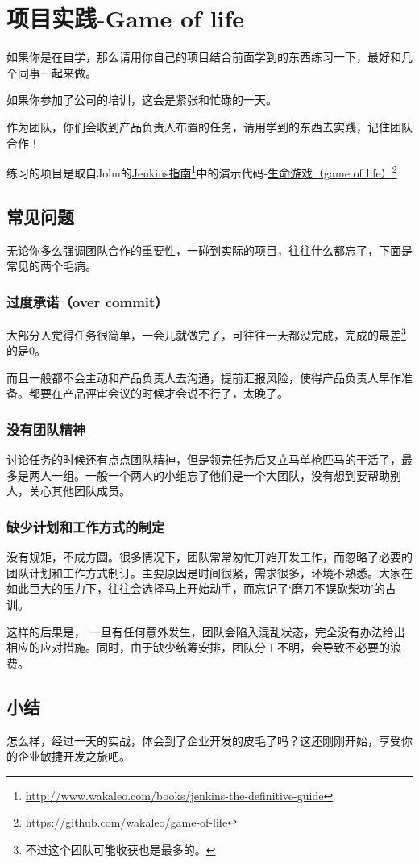 \chapter{项目实践-Game of life}
\label{项目实践-gameoflife}

如果你是在自学，那么请用你自己的项目结合前面学到的东西练习一下，最好和几个同事一起来做。

如果你参加了公司的培训，这会是紧张和忙碌的一天。

作为团队，你们会收到产品负责人布置的任务，请用学到的东西去实践，记住团队合作！

练习的项目是取自John的\href{http://www.wakaleo.com/books/jenkins-the-definitive-guide}{Jenkins指南}\footnote{\href{http://www.wakaleo.com/books/jenkins-the-definitive-guide}{http:/\slash www.wakaleo.com\slash books\slash jenkins-the-definitive-guide}}中的演示代码-\href{https://github.com/wakaleo/game-of-life}{生命游戏（game of life）}\footnote{\href{https://github.com/wakaleo/game-of-life}{https:/\slash github.com\slash wakaleo\slash game-of-life}}

\section{常见问题}
\label{常见问题}

无论你多么强调团队合作的重要性，一碰到实际的项目，往往什么都忘了，下面是常见的两个毛病。

\subsection{过度承诺（over commit）}
\label{过度承诺（overcommit）}

大部分人觉得任务很简单，一会儿就做完了，可往往一天都没完成，完成的最差\footnote{不过这个团队可能收获也是最多的。}的是0。

而且一般都不会主动和产品负责人去沟通，提前汇报风险，使得产品负责人早作准备。都要在产品评审会议的时候才会说不行了，太晚了。

\subsection{没有团队精神}
\label{没有团队精神}

讨论任务的时候还有点点团队精神，但是领完任务后又立马单枪匹马的干活了，最多是两人一组。一般一个两人的小组忘了他们是一个大团队，没有想到要帮助别人，关心其他团队成员。

\subsection{缺少计划和工作方式的制定}
\label{缺少计划和工作方式的制定}

没有规矩，不成方圆。很多情况下，团队常常匆忙开始开发工作，而忽略了必要的团队计划和工作方式制订。主要原因是时间很紧，需求很多，环境不熟悉。大家在如此巨大的压力下，往往会选择马上开始动手，而忘记了‘磨刀不误砍柴功’的古训。

这样的后果是， 一旦有任何意外发生，团队会陷入混乱状态，完全没有办法给出相应的应对措施。同时，由于缺少统筹安排，团队分工不明，会导致不必要的浪费。

\section{小结}
\label{小结}

怎么样，经过一天的实战，体会到了企业开发的皮毛了吗？这还刚刚开始，享受你的企业敏捷开发之旅吧。
